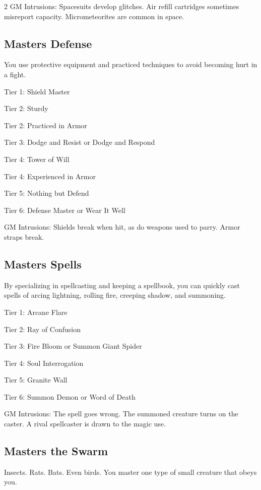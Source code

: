 \begin{multicols}{2}
GM Intrusions: Spacesuits develop glitches. Air refill cartridges sometimes misreport capacity. Micrometeorites are common in space.

\subsection{Masters Defense}

You use protective equipment and practiced techniques to avoid becoming hurt in a fight.

Tier 1: Shield Master

Tier 2: Sturdy

Tier 2: Practiced in Armor

Tier 3: Dodge and Resist or Dodge and Respond

Tier 4: Tower of Will

Tier 4: Experienced in Armor

Tier 5: Nothing but Defend

Tier 6: Defense Master or Wear It Well

GM Intrusions: Shields break when hit, as do weapons used to parry. Armor straps break.

\subsection{Masters Spells}

By specializing in spellcasting and keeping a spellbook, you can quickly cast spells of arcing lightning, rolling fire, creeping shadow, and summoning.

Tier 1: Arcane Flare

Tier 2: Ray of Confusion

Tier 3: Fire Bloom or Summon Giant Spider

Tier 4: Soul Interrogation

Tier 5: Granite Wall

Tier 6: Summon Demon or Word of Death 

GM Intrusions: The spell goes wrong. The summoned creature turns on the caster. A rival spellcaster is drawn to the magic use.

\subsection{Masters the Swarm}

Insects. Rats. Bats. Even birds. You master one type of small creature that obeys you.


\end{multicols}
